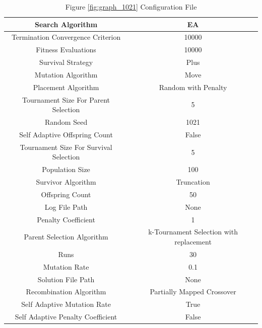 \documentclass{standalone}
\begin{document}
\clearpage
\begin{table}[!htb]
	\centering
	\caption{Figure \ref{fig:graph_1021} Configuration File}
	\label{tab:graph_1021}
	\begin{tabular}{| c | c |}
		\hline
		Search Algorithm		& EA		 \\
		\hline
		Termination Convergence Criterion		& 10000		 \\
		\hline
		Fitness Evaluations		& 10000		 \\
		\hline
		Survival Strategy		& Plus		 \\
		\hline
		Mutation Algorithm		& Move		 \\
		\hline
		Placement Algorithm		& Random with Penalty		 \\
		\hline
		Tournament Size For Parent Selection		& 5		 \\
		\hline
		Random Seed		& 1021		 \\
		\hline
		Self Adaptive Offspring Count		& False		 \\
		\hline
		Tournament Size For Survival Selection		& 5		 \\
		\hline
		Population Size		& 100		 \\
		\hline
		Survivor Algorithm		& Truncation		 \\
		\hline
		Offspring Count		& 50		 \\
		\hline
		Log File Path		& None		 \\
		\hline
		Penalty Coefficient		& 1		 \\
		\hline
		Parent Selection Algorithm		& k-Tournament Selection with replacement		 \\
		\hline
		Runs		& 30		 \\
		\hline
		Mutation Rate		& 0.1		 \\
		\hline
		Solution File Path		& None		 \\
		\hline
		Recombination Algorithm		& Partially Mapped Crossover		 \\
		\hline
		Self Adaptive Mutation Rate		& True		 \\
		\hline
		Self Adaptive Penalty Coefficient		& False		 \\
		\hline
	\end{tabular}
\end{table}
\end{document}
